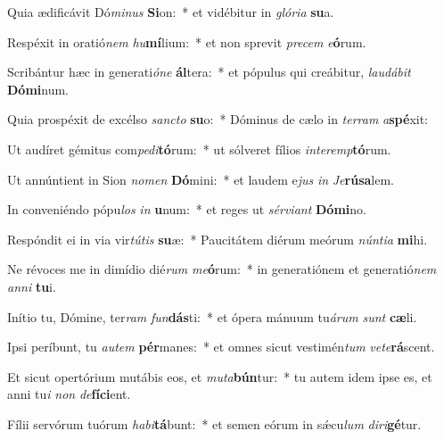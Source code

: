 \item Quia ædificávit Dó\textit{mi}\textit{nus} \textbf{Si}on:~* et vidébitur in \textit{gló}\textit{ri}\textit{a} \textbf{su}a.
\item Respéxit in oratió\textit{nem} \textit{hu}\textbf{mí}lium:~* et non sprevit \textit{pre}\textit{cem} \textit{e}\textbf{ó}rum.
\item Scribántur hæc in generati\textit{ó}\textit{ne} \textbf{ál}tera:~* et pópulus qui creábitur, \textit{lau}\textit{dá}\textit{bit} \textbf{Dó}\textbf{mi}num.
\item Quia prospéxit de excélso \textit{sanc}\textit{to} \textbf{su}o:~* Dóminus de cælo in \textit{ter}\textit{ram} \textit{a}\textbf{spé}xit:
\item Ut audíret gémitus com\textit{pe}\textit{di}\textbf{tó}rum:~* ut sólveret fílios \textit{in}\textit{ter}\textit{emp}\textbf{tó}rum.
\item Ut annúntient in Sion \textit{no}\textit{men} \textbf{Dó}mini:~* et laudem e\textit{jus} \textit{in} \textit{Je}\textbf{rú}\textbf{sa}lem.
\item In conveniéndo pópu\textit{los} \textit{in} \textbf{u}num:~* et reges ut \textit{sér}\textit{vi}\textit{ant} \textbf{Dó}\textbf{mi}no.
\item Respóndit ei in via vir\textit{tú}\textit{tis} \textbf{su}æ:~* Paucitátem diérum meórum \textit{nún}\textit{ti}\textit{a} \textbf{mi}hi.
\item Ne révoces me in dimídio dié\textit{rum} \textit{me}\textbf{ó}rum:~* in generatiónem et generatió\textit{nem} \textit{an}\textit{ni} \textbf{tu}i.
\item Inítio tu, Dómine, ter\textit{ram} \textit{fun}\textbf{dás}ti:~* et ópera mánuum tu\textit{á}\textit{rum} \textit{sunt} \textbf{cæ}li.
\item Ipsi períbunt, tu \textit{au}\textit{tem} \textbf{pér}manes:~* et omnes sicut vestimén\textit{tum} \textit{ve}\textit{te}\textbf{rá}scent.
\item Et sicut opertórium mutábis eos, et \textit{mu}\textit{ta}\textbf{bún}tur:~* tu autem idem ipse es, et anni tu\textit{i} \textit{non} \textit{de}\textbf{fí}\textbf{ci}ent.
\item Fílii servórum tuórum \textit{ha}\textit{bi}\textbf{tá}bunt:~* et semen eórum in sǽcu\textit{lum} \textit{di}\textit{ri}\textbf{gé}tur.
